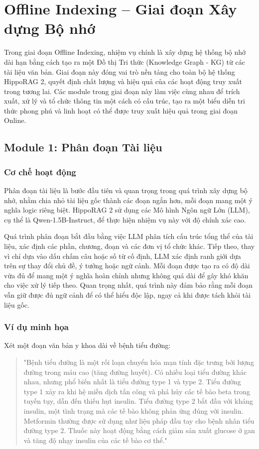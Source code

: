 \section{Offline Indexing – Giai đoạn Xây dựng Bộ nhớ}

Trong giai đoạn Offline Indexing, nhiệm vụ chính là xây dựng hệ thống bộ nhớ dài hạn bằng cách tạo ra một Đồ thị Tri thức (Knowledge Graph - KG) từ các tài liệu văn bản. Giai đoạn này đóng vai trò nền tảng cho toàn bộ hệ thống HippoRAG 2, quyết định chất lượng và hiệu quả của các hoạt động truy xuất trong tương lai. Các module trong giai đoạn này làm việc cùng nhau để trích xuất, xử lý và tổ chức thông tin một cách có cấu trúc, tạo ra một biểu diễn tri thức phong phú và linh hoạt có thể được truy xuất hiệu quả trong giai đoạn Online.

\subsection{Module 1: Phân đoạn Tài liệu}

\subsubsection{Cơ chế hoạt động}
Phân đoạn tài liệu là bước đầu tiên và quan trọng trong quá trình xây dựng bộ nhớ, nhằm chia nhỏ tài liệu gốc thành các đoạn ngắn hơn, mỗi đoạn mang một ý nghĩa logic riêng biệt. HippoRAG 2 sử dụng các Mô hình Ngôn ngữ Lớn (LLM), cụ thể là Qwen-1.5B-Instruct, để thực hiện nhiệm vụ này với độ chính xác cao.

Quá trình phân đoạn bắt đầu bằng việc LLM phân tích cấu trúc tổng thể của tài liệu, xác định các phần, chương, đoạn và các đơn vị tổ chức khác. Tiếp theo, thay vì chỉ dựa vào dấu chấm câu hoặc số từ cố định, LLM xác định ranh giới dựa trên sự thay đổi chủ đề, ý tưởng hoặc ngữ cảnh. Mỗi đoạn được tạo ra có độ dài vừa đủ để mang một ý nghĩa hoàn chỉnh nhưng không quá dài để gây khó khăn cho việc xử lý tiếp theo. Quan trọng nhất, quá trình này đảm bảo rằng mỗi đoạn vẫn giữ được đủ ngữ cảnh để có thể hiểu độc lập, ngay cả khi được tách khỏi tài liệu gốc.

\subsubsection{Ví dụ minh họa}
Xét một đoạn văn bản y khoa dài về bệnh tiểu đường:

\begin{quote}
"Bệnh tiểu đường là một rối loạn chuyển hóa mạn tính đặc trưng bởi lượng đường trong máu cao (tăng đường huyết). Có nhiều loại tiểu đường khác nhau, nhưng phổ biến nhất là tiểu đường type 1 và type 2. Tiểu đường type 1 xảy ra khi hệ miễn dịch tấn công và phá hủy các tế bào beta trong tuyến tụy, dẫn đến thiếu hụt insulin. Tiểu đường type 2 bắt đầu với kháng insulin, một tình trạng mà các tế bào không phản ứng đúng với insulin. Metformin thường được sử dụng như liệu pháp đầu tay cho bệnh nhân tiểu đường type 2. Thuốc này hoạt động bằng cách giảm sản xuất glucose ở gan và tăng độ nhạy insulin của các tế bào cơ thể."
\end{quote}

